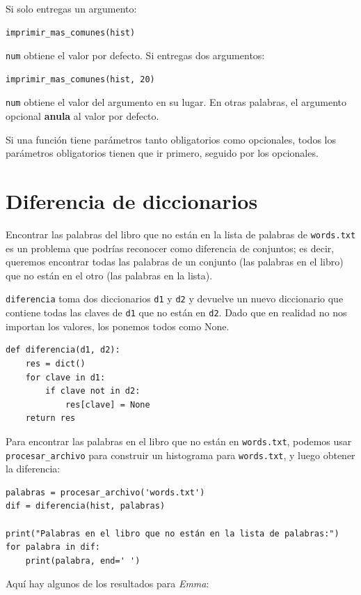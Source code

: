 \documentclass[10pt]{book}
\begin{document}
Si solo entregas un argumento:

\begin{verbatim}
imprimir_mas_comunes(hist)
\end{verbatim}

{\tt num} obtiene el valor por defecto.  Si entregas dos argumentos:

\begin{verbatim}
imprimir_mas_comunes(hist, 20)
\end{verbatim}

{\tt num} obtiene el valor del argumento en su lugar.  En otras
palabras, el argumento opcional {\bf anula} al valor por defecto.

Si una función tiene parámetros tanto obligatorios como opcionales, todos
los parámetros obligatorios tienen que ir primero, seguido por los
opcionales.


\section{Diferencia de diccionarios}
\label{dictsub}

Encontrar las palabras del libro que no están en la lista de palabras
de {\tt words.txt} es un problema que podrías reconocer como diferencia
de conjuntos; es decir, queremos encontrar todas las palabras de un
conjunto (las palabras en el libro) que no están en el otro (las
palabras en la lista).

{\tt diferencia} toma dos diccionarios {\tt d1} y {\tt d2} y devuelve un
nuevo diccionario que contiene todas las claves de {\tt d1} que no están
en {\tt d2}.  Dado que en realidad no nos importan los valores,
los ponemos todos como None.

\begin{verbatim}
def diferencia(d1, d2):
    res = dict()
    for clave in d1:
        if clave not in d2:
            res[clave] = None
    return res
\end{verbatim}
%
Para encontrar las palabras en el libro que no están en {\tt words.txt},
podemos usar \verb"procesar_archivo" para construir un histograma para
{\tt words.txt}, y luego obtener la diferencia:

\begin{verbatim}
palabras = procesar_archivo('words.txt')
dif = diferencia(hist, palabras)

print("Palabras en el libro que no están en la lista de palabras:")
for palabra in dif:
    print(palabra, end=' ')
\end{verbatim}
%
Aquí hay algunos de los resultados para {\em Emma}:
\end{document}
